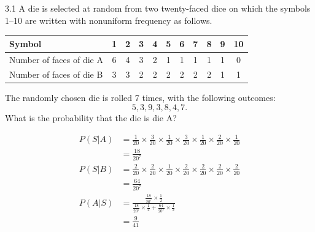 \documentclass[12pt, a4paper]{article}
\begin{document}
\begin{prob}{3.1}
    A die is selected at random from two twenty-faced dice on which the symbols 1--10 are written with nonuniform frequency as follows.

\begin{center}
\begin{tabular}{lcccccccccc}
\hline
Symbol & 1 & 2 & 3 & 4 & 5 & 6 & 7 & 8 & 9 & 10 \\
\hline
Number of faces of die A & 6 & 4 & 3 & 2 & 1 & 1 & 1 & 1 & 1 & 0 \\
Number of faces of die B & 3 & 3 & 2 & 2 & 2 & 2 & 2 & 2 & 1 & 1 \\
\hline
\end{tabular}
\end{center}

The randomly chosen die is rolled 7 times, with the following outcomes:
\[ 5, 3, 9, 3, 8, 4, 7. \]
What is the probability that the die is die A?
\end{prob}
\begin{sol}
    \begin{align*}
        P(S|A) &= \frac{1}{20} \times \frac{3}{20} \times \frac{1}{20} \times \frac{3}{20} \times \frac{1}{20} \times \frac{2}{20} \times  \frac{1}{20} \\
        &= \frac{18}{20^7} \\
        P(S|B) &= \frac{2}{20} \times \frac{2}{20} \times \frac{1}{20} \times \frac{2}{20} \times \frac{2}{20} \times \frac{2}{20} \times \frac{2}{20} \\
        &= \frac{64}{20^7} \\
        P(A|S) &= \frac{\frac{18}{20^7} \times \frac{1}{2}}{\frac{18}{20^7} \times \frac{1}{2} + \frac{64}{20^7} \times \frac{1}{2}} \\
        &= \frac{9}{41} \\
    \end{align*}
\end{sol}
\bigskip
\end{document}
